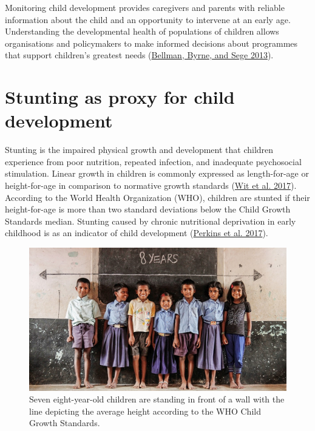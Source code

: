 \documentclass[
]{book}
\begin{document}
Monitoring child development provides caregivers and parents with reliable information about the child and an opportunity to intervene at an early age. Understanding the developmental health of populations of children allows organisations and policymakers to make informed decisions about programmes that support children's greatest needs (\protect\hyperlink{ref-bellman2013}{Bellman, Byrne, and Sege 2013}).

\hypertarget{sec:stunting}{%
\section{Stunting as proxy for child development}\label{sec:stunting}}

Stunting is the impaired physical growth and development that children experience from poor nutrition, repeated infection, and inadequate psychosocial stimulation. Linear growth in children is commonly expressed as length-for-age or height-for-age in comparison to normative growth standards (\protect\hyperlink{ref-wit2017practical}{Wit et al. 2017}). According to the World Health Organization (WHO), children are stunted if their height-for-age is more than two standard deviations below the Child Growth Standards median. Stunting caused by chronic nutritional deprivation in early childhood is as an indicator of child development (\protect\hyperlink{ref-perkins2017understanding}{Perkins et al. 2017}).

\begin{figure}

{\centering \includegraphics[width=1\linewidth]{fig/stuntedchildren} 

}

\caption{Seven eight-year-old children are standing in front of a wall with the line depicting the average height according to the WHO Child Growth Standards.}\label{fig:shortkids}
\end{figure}
\end{document}
